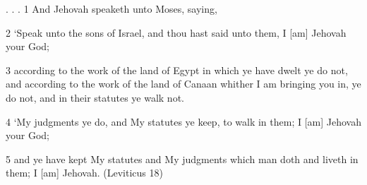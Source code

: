 \documentclass[11pt]{article}
\begin{document}
. . .
1 And Jehovah speaketh unto Moses, saying,

2 `Speak unto the sons of Israel, and thou hast said unto them, I [am] Jehovah your God;

3 according to the work of the land of Egypt in which ye have dwelt ye do not, and according to the work of the land of Canaan whither I am bringing you in, ye do not, and in their statutes ye walk not.

4 `My judgments ye do, and My statutes ye keep, to walk in them; I [am] Jehovah your God;

5 and ye have kept My statutes and My judgments which man doth and liveth in them; I [am] Jehovah. (Leviticus 18)



%
%
%
%
%
%
%
%
\end{document}
